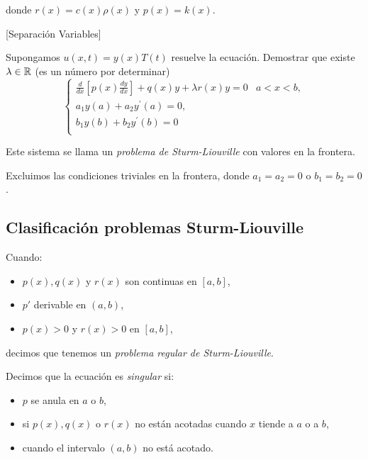 donde $r(x)=c(x) \rho(x)$ y $p(x)=k(x)$.

   
 
 

\begin{ejercicio}{}[Separación Variables]
 
Supongamos $u(x, t)=y(x) T(t)$ resuelve la ecuación. Demostrar  que existe $\lambda\in\mathbb{R}$ (es un número por determinar)
\[
 \left\{
        \begin{array}{ll}
        \frac{d}{d x}\left[p(x) \frac{d y}{d x}\right]+q(x) y+\lambda r(x) y=0 & a<x<b,\\
        a_{1} y(a)+a_{2} y^{\prime}(a)=0, &\\
        b_{1} y(b)+b_{2} y^{\prime}(b)=0 & \\
        \end{array}
 \right.
 \]
\end{ejercicio}

Este sistema se llama  un \emph{problema de Sturm-Liouville} con valores en la frontera. 

Excluimos las condiciones triviales en la frontera, donde $a_{1}=a_{2}=0$ o $b_{1}=b_{2}=0$. 



 
 

\subsection{Clasificación problemas Sturm-Liouville}

\begin{definicion}{}
 Cuando:
 \begin{itemize}
  \item  $p(x), q(x)$ y $r(x)$ son continuas en $[a, b]$, 
  \item $p'$ derivable en $(a,b)$,
  \item $p(x)>0$ y $r(x)>0$ en $[a, b]$, 
 \end{itemize}
decimos que tenemos un  \emph{ problema regular de Sturm-Liouville}.


Decimos que la ecuación es \emph{singular} si:
 \begin{itemize}
  \item $p$ se anula en $a$ o  $ b$,
  \item si $p(x), q(x)$ o $r(x)$ no están acotadas cuando $x$ tiende a $a$ o a $b$,
  \item cuando el intervalo $(a, b)$ no está acotado. 
 \end{itemize}



  
\end{definicion}


